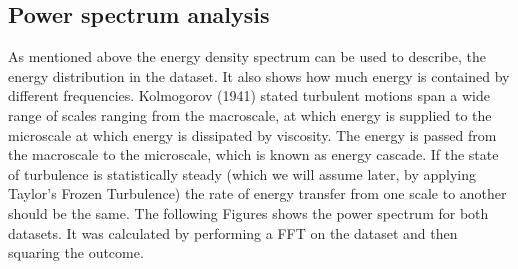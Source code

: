 \documentclass[12pt]{article}
\begin{document}
\subsection{Power spectrum analysis}
As mentioned above the energy density spectrum can be used to describe, the energy distribution in the dataset. It also shows how much energy is contained by different frequencies. Kolmogorov (1941) stated turbulent motions span a wide range of scales ranging from the macroscale, at which energy is supplied to the microscale at which energy is dissipated by viscosity. The energy is passed from the macroscale to the microscale, which is known as energy cascade. If the state of turbulence is statistically steady (which we will assume later, by applying Taylor's Frozen Turbulence) the rate of energy transfer from one scale to another should be the same. \cite{cushman} The following Figures shows the power spectrum for both datasets. It was calculated by performing a FFT on the dataset and then squaring the outcome. 
\end{document}

